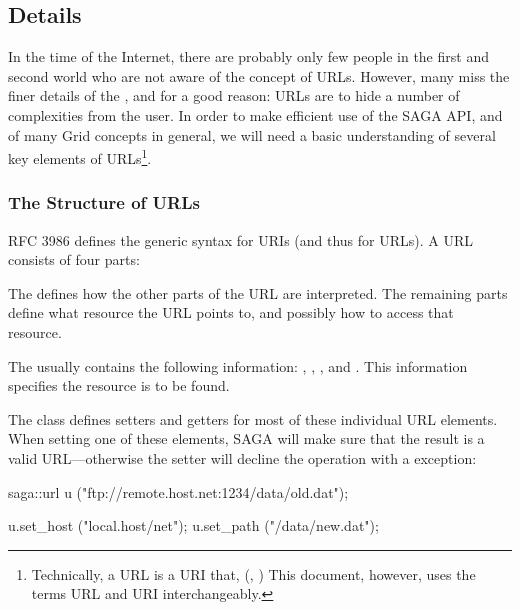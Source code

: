 \subsection{Details}

 In the time of the Internet, there are probably only few people
 in the first and second world who are not aware of the concept
 of URLs.  However, many miss the finer details of the 
 , and for a good reason: URLs are
  to hide a number of complexities from the user.  In
 order to make efficient use of the SAGA API, and of many Grid
 concepts in general, we will need a basic understanding of
 several key elements of URLs\footnote{Technically, a URL is a
 URI that, 
 (,
 )  This document,
 however, uses the terms URL and URI interchangeably.}.

 \subsubsection{The Structure of URLs}


  RFC 3986\cite{rfc-3986} defines the generic syntax for URIs (and thus
  for URLs).  A URL consists of four parts:

  \sshift {}

  The  defines how the other parts of the URL are
  interpreted.  The remaining parts define what resource the URL
  points to, and possibly how to access that resource.

  The  usually contains the following
  information: , , , and .  This
  information specifies  the resource is to be
  found.

  The  class defines setters and getters for most of
  these individual URL elements.  When setting one of these
  elements, SAGA will make sure that the result is a valid URL---otherwise the setter will decline the operation with a
   exception:

  \begin{mycode}
  saga::url u  ("ftp://remote.host.net:1234/data/old.dat");

  u.set_host   ("local.host/net");
  u.set_path   ("/data/new.dat");
  \end{mycode}

